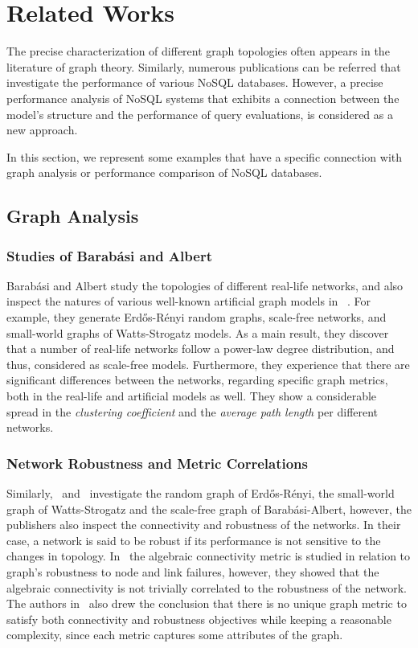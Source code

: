 \chapter{Related Works}

The precise characterization of different graph topologies often appears in the literature of graph theory. Similarly, numerous publications can be referred that investigate the performance of various NoSQL databases. However, a precise performance analysis of NoSQL systems that exhibits a connection between the model's structure and the performance of query evaluations, is considered as a new approach.

In this section, we represent some examples that have a specific connection with graph analysis or performance comparison of NoSQL databases.

\section{Graph Analysis}
\subsection{Studies of Barabási and Albert}

Barabási and Albert study the topologies of different real-life networks, and also inspect the natures of various well-known artificial graph models in ~\cite{statistical_mechanics}. For example, they generate Erdős-Rényi random graphs, scale-free networks, and small-world graphs of Watts-Strogatz models. As a main result, they discover that a number of real-life networks follow a power-law degree distribution, and thus, considered as scale-free models. Furthermore, they experience that there are significant differences between the networks, regarding specific graph metrics, both in the real-life and artificial models as well. They show a considerable spread in the \textit{clustering coefficient} and the \textit{average path length} per different networks.

\subsection{Network Robustness and Metric Correlations}\label{sec:algebraic_connectivity}

Similarly,~\cite{algebraic1} and~\cite{algebraic2} investigate the random graph of Erdős-Rényi, the small-world graph of Watts-Strogatz and the scale-free graph of Barabási-Albert, however, the publishers also inspect the connectivity and robustness of the networks. In their case, a network is said to be robust if its performance is not sensitive to the changes in topology. In~\cite{algebraic1} the algebraic connectivity metric is studied in relation to graph’s robustness to node and link failures, however, they showed that the algebraic connectivity is not trivially correlated to the robustness of the network. The authors in~\cite{algebraic2} also drew the conclusion that there is no unique graph metric to satisfy both connectivity and robustness objectives while keeping a reasonable complexity, since each metric captures some attributes of the graph.


